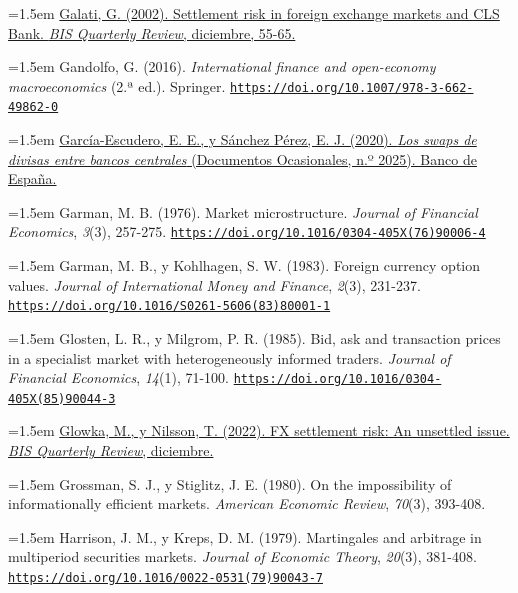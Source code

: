 \documentclass[10pt,a4paper]{article}
\begin{document}
\noindent\hangindent=1.5em \href{https://www.bis.org/publications/qr/r-qt0212f.pdf}{Galati, G. (2002). Settlement risk in foreign exchange markets and CLS Bank. \textit{BIS Quarterly Review}, diciembre, 55-65.}

\noindent\hangindent=1.5em Gandolfo, G. (2016). \textit{International finance and open-economy macroeconomics} (2.ª ed.). Springer. \href{https://doi.org/10.1007/978-3-662-49862-0}{\nolinkurl{https://doi.org/10.1007/978-3-662-49862-0}}

\noindent\hangindent=1.5em \href{https://repositorio.bde.es/handle/123456789/13881}{García-Escudero, E. E., y Sánchez Pérez, E. J. (2020). \textit{Los swaps de divisas entre bancos centrales} (Documentos Ocasionales, n.º 2025). Banco de España.}

\noindent\hangindent=1.5em Garman, M. B. (1976). Market microstructure. \textit{Journal of Financial Economics}, \textit{3}(3), 257-275. \href{https://doi.org/10.1016/0304-405X(76)90006-4}{\nolinkurl{https://doi.org/10.1016/0304-405X(76)90006-4}}

\noindent\hangindent=1.5em Garman, M. B., y Kohlhagen, S. W. (1983). Foreign currency option values. \textit{Journal of International Money and Finance}, \textit{2}(3), 231-237. \href{https://doi.org/10.1016/S0261-5606(83)80001-1}{\nolinkurl{https://doi.org/10.1016/S0261-5606(83)80001-1}}

\noindent\hangindent=1.5em Glosten, L. R., y Milgrom, P. R. (1985). Bid, ask and transaction prices in a specialist market with heterogeneously informed traders. \textit{Journal of Financial Economics}, \textit{14}(1), 71-100. \href{https://doi.org/10.1016/0304-405X(85)90044-3}{\nolinkurl{https://doi.org/10.1016/0304-405X(85)90044-3}}

\noindent\hangindent=1.5em \href{https://www.bis.org/publ/qtrpdf/r_qt2212i.htm}{Glowka, M., y Nilsson, T. (2022). FX settlement risk: An unsettled issue. \textit{BIS Quarterly Review}, diciembre.}

\noindent\hangindent=1.5em Grossman, S. J., y Stiglitz, J. E. (1980). On the impossibility of informationally efficient markets. \textit{American Economic Review}, \textit{70}(3), 393-408.

\noindent\hangindent=1.5em Harrison, J. M., y Kreps, D. M. (1979). Martingales and arbitrage in multiperiod securities markets. \textit{Journal of Economic Theory}, \textit{20}(3), 381-408. \href{https://doi.org/10.1016/0022-0531(79)90043-7}{\nolinkurl{https://doi.org/10.1016/0022-0531(79)90043-7}}
\end{document}
